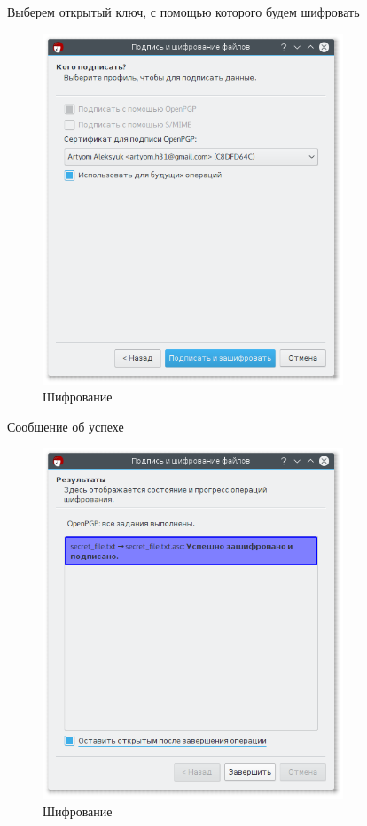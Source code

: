 Выберем открытый ключ, с помощью которого будем шифровать

\begin{figure}[H]
	\centering
	\includegraphics[width=0.8\textwidth]{figures/screen20.png}
	\caption{Шифрование}
\end{figure}

Сообщение об успехе

\begin{figure}[H]
	\centering
	\includegraphics[width=0.8\textwidth]{figures/screen21.png}
	\caption{Шифрование}
\end{figure}

